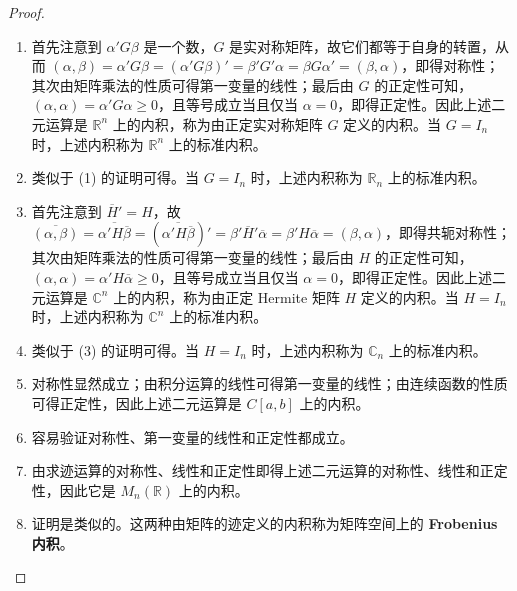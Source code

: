 \documentclass[../../main.tex]{subfiles}%
\begin{document}
\begin{proof}
\begin{enumerate}[(1)]
\item 首先注意到 $\alpha'G\beta$ 是一个数，$G$ 是实对称矩阵，故它们都等于自身的转置，从而 $(\alpha, \beta) = \alpha'G\beta = (\alpha'G\beta)' = \beta'G'\alpha = \beta G\alpha' = (\beta, \alpha)$，即得对称性；其次由矩阵乘法的性质可得第一变量的线性；最后由 $G$ 的正定性可知，$(\alpha, \alpha) = \alpha'G\alpha \geqslant  0$，且等号成立当且仅当 $\alpha = 0$，即得正定性。因此上述二元运算是 $\mathbb{R}^n$ 上的内积，称为由正定实对称矩阵 $G$ 定义的内积。当 $G = I_n$ 时，上述内积称为 $\mathbb{R}^n$ 上的标准内积。

\item 类似于 (1) 的证明可得。当 $G = I_n$ 时，上述内积称为 $\mathbb{R}_n$ 上的标准内积。

\item 首先注意到 $\overline{H}' = H$，故 $\overline{(\alpha, \beta)} = \overline{\alpha' H\overline{\beta}} = (\overline{\alpha' H\overline{\beta}})' = \beta'\overline{H}'\overline{\alpha} = \beta' H\overline{\alpha} = (\beta, \alpha)$，即得共轭对称性；其次由矩阵乘法的性质可得第一变量的线性；最后由 $H$ 的正定性可知，$(\alpha, \alpha) = \alpha' H\overline{\alpha} \geqslant  0$，且等号成立当且仅当 $\alpha = 0$，即得正定性。因此上述二元运算是 $\mathbb{C}^n$ 上的内积，称为由正定 Hermite 矩阵 $H$ 定义的内积。当 $H = I_n$ 时，上述内积称为 $\mathbb{C}^n$ 上的标准内积。

\item 类似于 (3) 的证明可得。当 $H = I_n$ 时，上述内积称为 $\mathbb{C}_n$ 上的标准内积。

\item 对称性显然成立；由积分运算的线性可得第一变量的线性；由连续函数的性质可得正定性，因此上述二元运算是 $C[a, b]$ 上的内积。

\item 容易验证对称性、第一变量的线性和正定性都成立。

\item 由求迹运算的对称性、线性和正定性即得上述二元运算的对称性、线性和正定性，因此它是 $M_n(\mathbb{R})$ 上的内积。

\item 证明是类似的。这两种由矩阵的迹定义的内积称为矩阵空间上的 \hypertarget{Frobenius 内积}{\textbf{Frobenius 内积}}。
\end{enumerate}
\end{proof}
\end{document}
